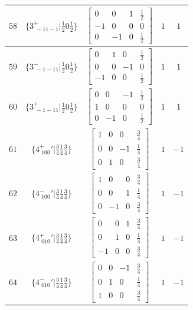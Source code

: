 \documentclass[fleqn,8pt]{jsarticle}
\begin{document}
\begin{longtable}{ccccc}
$ 58 $ & $ \{3^{+}_{\,\,-11-1}|\frac{1}{2} 0 \frac{1}{2}\} $ & $ \begin{bmatrix} 0 & 0 & 1 & \frac{1}{2} \\ -1 & 0 & 0 & 0 \\ 0 & -1 & 0 & \frac{1}{2} \end{bmatrix} $ & $ 1 $ & $ 1 $ \\ \hline
$ 59 $ & $ \{3^{-}_{\,\,-1-11}|\frac{1}{2} 0 \frac{1}{2}\} $ & $ \begin{bmatrix} 0 & 1 & 0 & \frac{1}{2} \\ 0 & 0 & -1 & 0 \\ -1 & 0 & 0 & \frac{1}{2} \end{bmatrix} $ & $ 1 $ & $ 1 $ \\ \hline
$ 60 $ & $ \{3^{+}_{\,\,-1-11}|\frac{1}{2} 0 \frac{1}{2}\} $ & $ \begin{bmatrix} 0 & 0 & -1 & \frac{1}{2} \\ 1 & 0 & 0 & 0 \\ 0 & -1 & 0 & \frac{1}{2} \end{bmatrix} $ & $ 1 $ & $ 1 $ \\ \hline
$ 61 $ & $ \{4^{+}_{\,\,100}{}'|\frac{3}{4} \frac{1}{4} \frac{3}{4}\} $ & $ \begin{bmatrix} 1 & 0 & 0 & \frac{3}{4} \\ 0 & 0 & -1 & \frac{1}{4} \\ 0 & 1 & 0 & \frac{3}{4} \end{bmatrix} $ & $ 1 $ & $ -1 $ \\ \hline
$ 62 $ & $ \{4^{-}_{\,\,100}{}'|\frac{3}{4} \frac{1}{4} \frac{3}{4}\} $ & $ \begin{bmatrix} 1 & 0 & 0 & \frac{3}{4} \\ 0 & 0 & 1 & \frac{1}{4} \\ 0 & -1 & 0 & \frac{3}{4} \end{bmatrix} $ & $ 1 $ & $ -1 $ \\ \hline
$ 63 $ & $ \{4^{+}_{\,\,010}{}'|\frac{3}{4} \frac{1}{4} \frac{3}{4}\} $ & $ \begin{bmatrix} 0 & 0 & 1 & \frac{3}{4} \\ 0 & 1 & 0 & \frac{1}{4} \\ -1 & 0 & 0 & \frac{3}{4} \end{bmatrix} $ & $ 1 $ & $ -1 $ \\ \hline
$ 64 $ & $ \{4^{-}_{\,\,010}{}'|\frac{3}{4} \frac{1}{4} \frac{3}{4}\} $ & $ \begin{bmatrix} 0 & 0 & -1 & \frac{3}{4} \\ 0 & 1 & 0 & \frac{1}{4} \\ 1 & 0 & 0 & \frac{3}{4} \end{bmatrix} $ & $ 1 $ & $ -1 $ \\ \hline

\end{longtable}
\end{document}
